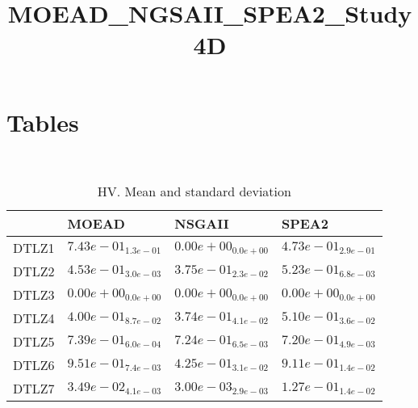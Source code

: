 \documentclass{article}
\title{MOEAD_NGSAII_SPEA2_Study4D}
\author{}
\begin{document}
\maketitle
\section{Tables}
\
\begin{table}
\caption{HV. Mean and standard deviation}
\label{table:mean.HV}
\centering
\begin{scriptsize}
\begin{tabular}{llll}
\hline & MOEAD & NSGAII &  SPEA2\\
\hline
DTLZ1 & \cellcolor{gray95}$  7.43e-01_{ 1.3e-01}$ & $  0.00e+00_{ 0.0e+00}$ & $  4.73e-01_{ 2.9e-01}$ \\
DTLZ2 & \cellcolor{gray25}$  4.53e-01_{ 3.0e-03}$ & $  3.75e-01_{ 2.3e-02}$ & \cellcolor{gray95}$  5.23e-01_{ 6.8e-03}$ \\
DTLZ3 & $  0.00e+00_{ 0.0e+00}$ & $  0.00e+00_{ 0.0e+00}$ & $  0.00e+00_{ 0.0e+00}$ \\
DTLZ4 & \cellcolor{gray25}$  4.00e-01_{ 8.7e-02}$ & $  3.74e-01_{ 4.1e-02}$ & \cellcolor{gray95}$  5.10e-01_{ 3.6e-02}$ \\
DTLZ5 & \cellcolor{gray95}$  7.39e-01_{ 6.0e-04}$ & \cellcolor{gray25}$  7.24e-01_{ 6.5e-03}$ & $  7.20e-01_{ 4.9e-03}$ \\
DTLZ6 & \cellcolor{gray95}$  9.51e-01_{ 7.4e-03}$ & $  4.25e-01_{ 3.1e-02}$ & $  9.11e-01_{ 1.4e-02}$ \\
DTLZ7 & \cellcolor{gray25}$  3.49e-02_{ 4.1e-03}$ & $  3.00e-03_{ 2.9e-03}$ & \cellcolor{gray95}$  1.27e-01_{ 1.4e-02}$ \\
\hline
\end{tabular}
\end{scriptsize}
\end{table}
\
\end{document}
